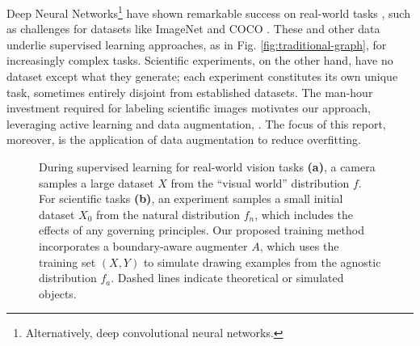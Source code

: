 \documentclass[10pt, journal]{IEEEtran}
\begin{document}
Deep Neural Networks\footnote{Alternatively, deep convolutional neural
  networks.}  have shown remarkable success on real-world tasks
\cite{krizhevsky_imagenet_2012}, such as challenges for datasets like ImageNet
\cite{deng_imagenet:_nodate} and COCO \cite{lin_microsoft_2014}. These and other
data underlie supervised learning approaches, as in
Fig. \ref{fig:traditional-graph}, for increasingly complex tasks. Scientific
experiments, on the other hand, have no dataset except what they generate; each
experiment constitutes its own unique task, sometimes entirely disjoint from
established datasets. The man-hour investment required for labeling scientific
images motivates our approach, leveraging active learning
\cite{settles_active_2012, kao_localization-aware_2018, jain_active_2016} and
data augmentation, \cite{krizhevsky_imagenet_2012, ronneberger_u-net:_2015}. The
focus of this report, moreover, is the application of data augmentation to
reduce overfitting.             %

\begin{figure}
  \centering
  \hfill
  \caption{During supervised learning for real-world vision tasks \textbf{(a)},
    a camera samples a large dataset $X$ from the ``visual world'' distribution
    $f$. For scientific tasks \textbf{(b)}, an experiment samples a small
    initial dataset $X_0$ from the natural distribution $f_n$, which includes
    the effects of any governing principles. Our proposed training method
    incorporates a boundary-aware augmenter $A$, which uses the training set
    $(X,Y)$ to simulate drawing examples from the agnostic distribution
    $f_a$. Dashed lines indicate theoretical or simulated objects.}
  \label{fig:dependency-graphs}
\end{figure}
\end{document}
